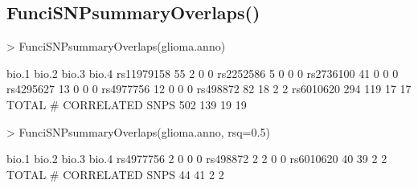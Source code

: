 \documentclass[a4paper]{article}
\begin{document}
\subsection*{FunciSNPsummaryOverlaps()}
\begin{Schunk}
\begin{Sinput}
> FunciSNPsummaryOverlaps(glioma.anno)
\end{Sinput}
\begin{Soutput}
                        bio.1 bio.2 bio.3 bio.4
rs11979158                 55     2     0     0
rs2252586                   5     0     0     0
rs2736100                  41     0     0     0
rs4295627                  13     0     0     0
rs4977756                  12     0     0     0
rs498872                   82    18     2     2
rs6010620                 294   119    17    17
TOTAL # CORRELATED SNPS   502   139    19    19
\end{Soutput}
\begin{Sinput}
> FunciSNPsummaryOverlaps(glioma.anno, rsq=0.5)
\end{Sinput}
\begin{Soutput}
                        bio.1 bio.2 bio.3 bio.4
rs4977756                   2     0     0     0
rs498872                    2     2     0     0
rs6010620                  40    39     2     2
TOTAL # CORRELATED SNPS    44    41     2     2
\end{Soutput}
\end{Schunk}
\end{document}
